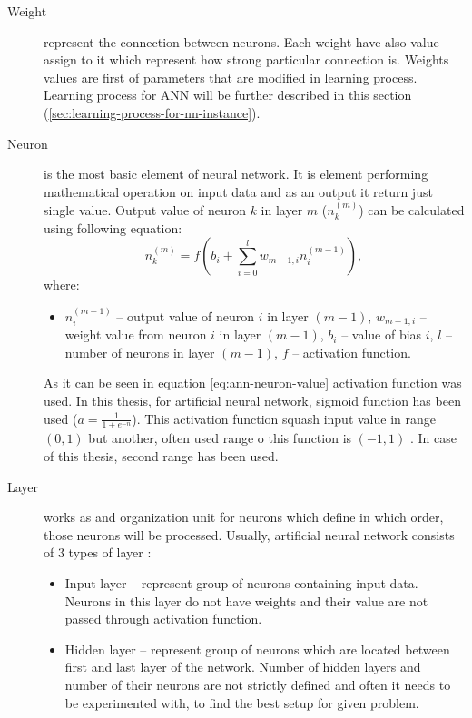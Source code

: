     \begin{description}
        \item[Weight] represent the connection between neurons. Each weight have also value assign to it which represent how strong particular connection is. Weights values are first of parameters that are modified in learning process. Learning process for ANN will be further described in this section (\ref{sec:learning-process-for-nn-instance}).
        \item[Neuron] is the most basic element of neural network. It is element performing mathematical operation on input data and as an output it return just single value. Output value of neuron $k$ in layer $m$ ($n_k^{(m)}$) can be calculated using following equation:
        \begin{equation}\label{eq:ann-neuron-value}
            n_k^{(m)} = f\left(b_i + \sum_{i = 0}^{l} w_{m-1, i} n_i^{(m-1)}\right),
        \end{equation}
        where:
        \begin{itemize}[label=]
            \item $n_i^{(m-1)}$ -- output value of neuron $i$ in layer $(m-1)$, $w_{m-1, i}$ -- weight value from neuron $i$ in layer $(m-1)$, $b_i$ -- value of bias $i$, $l$ -- number of neurons in layer $(m-1)$, $f$ -- activation function.
        \end{itemize}
        As it can be seen in equation \eqref{eq:ann-neuron-value} activation function was used. In this thesis, for artificial neural network, sigmoid function has been used ($a=\frac{1}{1 + e^{-n}}$). This activation function squash input value in range $(0, 1)$ but another, often used range o this function is $(-1, 1)$ \cite{bib:internet-sigmoid-function}. In case of this thesis, second range has been used.
        \item[Layer] works as and organization unit for neurons which define in which order, those neurons will be processed. Usually, artificial neural network consists of 3 types of layer \cite{bib:book-make-own-neural-network}:
        \begin{itemize}
            \item Input layer -- represent group of neurons containing input data. Neurons in this layer do not have weights and their value are not passed through activation function.
            \item Hidden layer -- represent group of neurons which are located between first and last layer of the network. Number of hidden layers and number of their neurons are not strictly defined and often it needs to be experimented with, to find the best setup for given problem.

\end{itemize}
\end{description}

